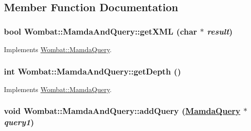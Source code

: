 \subsection{Member Function Documentation}
\hypertarget{classWombat_1_1MamdaAndQuery_a48717e120cf124653793d81c04cc74d}{
\subsubsection[getXML]{\setlength{\rightskip}{0pt plus 5cm}bool Wombat::Mamda\-And\-Query::get\-XML (char $\ast$ {\em result})}}
\label{classWombat_1_1MamdaAndQuery_a48717e120cf124653793d81c04cc74d}




Implements \hyperlink{classWombat_1_1MamdaQuery_d5a4bbc29d9a752db0d07fa1e3aa2f25}{Wombat::Mamda\-Query}.\hypertarget{classWombat_1_1MamdaAndQuery_63e70b86bfe67f53fd64bea4b9a201a4}{
\subsubsection[getDepth]{\setlength{\rightskip}{0pt plus 5cm}int Wombat::Mamda\-And\-Query::get\-Depth ()}}
\label{classWombat_1_1MamdaAndQuery_63e70b86bfe67f53fd64bea4b9a201a4}




Implements \hyperlink{classWombat_1_1MamdaQuery_1658aee7db0fd2fce15c63293c428597}{Wombat::Mamda\-Query}.\hypertarget{classWombat_1_1MamdaAndQuery_733bb9aab0d48fd2c26cf752e4f6822a}{
\subsubsection[addQuery]{\setlength{\rightskip}{0pt plus 5cm}void Wombat::Mamda\-And\-Query::add\-Query (\hyperlink{classWombat_1_1MamdaQuery}{Mamda\-Query} $\ast$ {\em query1})}}
\label{classWombat_1_1MamdaAndQuery_733bb9aab0d48fd2c26cf752e4f6822a}


